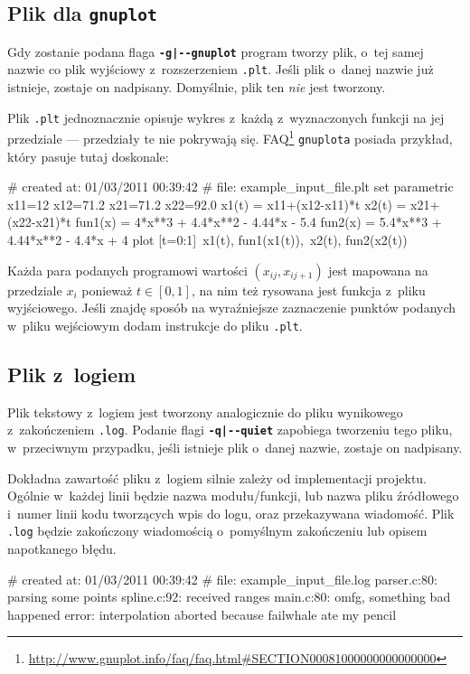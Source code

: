 \documentclass[10pt,a4paper]{article}
\newcommand{\prog}[1]{\texttt{#1}}
\newcommand{\flag}[1]{\textbf{\prog{#1}}}
\begin{document}
\subsection{Plik dla \texttt{gnuplot}}
\label{sec:plik_gnuplot}

Gdy zostanie podana flaga \flag{-g|-\--gnuplot} program tworzy plik, o~tej samej
nazwie co plik wyjściowy z~rozszerzeniem \prog{.plt}. Jeśli plik o~danej nazwie
już istnieje, zostaje on nadpisany. Domyślnie, plik ten \emph{nie} jest
tworzony.

Plik \prog{.plt} jednoznacznie opisuje wykres z~każdą z~wyznaczonych funkcji
na jej przedziale --- przedziały te nie pokrywają się.
FAQ\footnote{\url{http://www.gnuplot.info/faq/faq.html\#SECTION00081000000000000000}}
\texttt{gnuplota} posiada przykład, który pasuje tutaj doskonale:
\begin{SmallVerbatim}
    # created at: 01/03/2011 00:39:42
    #       file: example_input_file.plt
    set parametric
    x11=12
    x12=71.2
    x21=71.2
    x22=92.0
    x1(t) = x11+(x12-x11)*t
    x2(t) = x21+(x22-x21)*t
    fun1(x) = 4*x**3 + 4.4*x**2 - 4.44*x - 5.4
    fun2(x) = 5.4*x**3 + 4.44*x**2 - 4.4*x + 4
    plot [t=0:1]\
      x1(t), fun1(x1(t)),\
      x2(t), fun2(x2(t))
\end{SmallVerbatim}

Każda para podanych programowi wartości $(x_{ij}, x_{ij+1})$ jest mapowana na
przedziale $x_{i}$ ponieważ $t \in [0,1]$, na nim też rysowana jest funkcja
z~pliku wyjściowego. Jeśli znajdę sposób na wyraźniejsze zaznaczenie punktów
podanych w~pliku wejściowym dodam instrukcje do pliku \prog{.plt}.

\subsection{Plik z~logiem}
\label{sec:plik_log}

Plik tekstowy z~logiem jest tworzony analogicznie do pliku wynikowego
z~zakończeniem \prog{.log}. Podanie flagi \flag{-q|-\--quiet} zapobiega tworzeniu
tego pliku, w~przeciwnym przypadku, jeśli istnieje plik o~danej nazwie, zostaje
on nadpisany.

Dokładna zawartość pliku z~logiem silnie zależy od implementacji projektu.
Ogólnie w~każdej linii będzie nazwa modułu/funkcji, lub nazwa pliku źródłowego
i~numer linii kodu tworzących wpis do logu, oraz przekazywana wiadomość. Plik
\prog{.log} będzie zakończony wiadomością o~pomyślnym zakończeniu lub opisem
napotkanego błędu.
\vspace{-12pt}
\begin{SmallVerbatim}
    # created at: 01/03/2011 00:39:42
    #       file: example_input_file.log
    parser.c:80: parsing some points
    spline.c:92: received ranges
    main.c:80: omfg, something bad happened
    error: interpolation aborted because failwhale ate my pencil
\end{SmallVerbatim}
\end{document}
